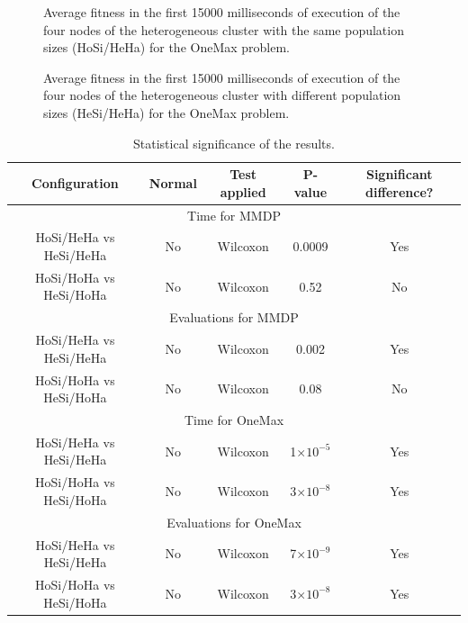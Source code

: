 \documentclass[final,1p,times]{elsarticle}
\providecommand{\e}[1]{\ensuremath{\times 10^{#1}}}
\begin{document}
\begin{figure}[htb]
\centering
{}
\caption{Average fitness in the first 15000 milliseconds of execution of the four nodes of the heterogeneous cluster with the same population sizes (HoSi/HeHa) for the OneMax problem.}
\label{fig:gensonemaxhomosize}
\end{figure}

\begin{figure}[htb]
\centering
{}
\caption{Average fitness in the first 15000 milliseconds of execution of the four nodes of the heterogeneous cluster with different population sizes (HeSi/HeHa) for the OneMax problem.}
\label{fig:gensonemaxheterosize}
\end{figure}

\begin{table}
\centering
\caption{Statistical significance of the results.}
\begin{tabular}{|c|c|c|c|c|} \hline
Configuration     &Normal &Test applied     &P-value & Significant difference?\\ \hline
\multicolumn{5}{|c|}{Time for MMDP} \\ \hline
HoSi/HeHa vs HeSi/HeHa  &No  &Wilcoxon    & 0.0009    & Yes \\ \hline
HoSi/HoHa vs HeSi/HoHa  &No   &Wilcoxon   &0.52   & No \\ \hline \hline
\multicolumn{5}{|c|}{Evaluations for MMDP}  \\ \hline
HoSi/HeHa vs HeSi/HeHa  &No  &Wilcoxon     &0.002  & Yes \\ \hline
HoSi/HoHa vs HeSi/HoHa  &No   &Wilcoxon   &0.08  & No \\ \hline \hline
\multicolumn{5}{|c|}{Time for OneMax} \\ \hline
HoSi/HeHa vs HeSi/HeHa  & No & Wilcoxon    &  1\e{-5} & Yes \\ \hline
HoSi/HoHa vs HeSi/HoHa  & No  & Wilcoxon    &  3\e{-8} & Yes \\ \hline \hline
\multicolumn{5}{|c|}{Evaluations for OneMax}  \\ \hline
HoSi/HeHa vs HeSi/HeHa  & No  & Wilcoxon    & 7\e{-9} & Yes\\ \hline
HoSi/HoHa vs HeSi/HoHa  & No & Wilcoxon    & 3\e{-8}  & Yes \\ \hline

\end{tabular}
\label{tab:significance}
\end{table}
\end{document}
